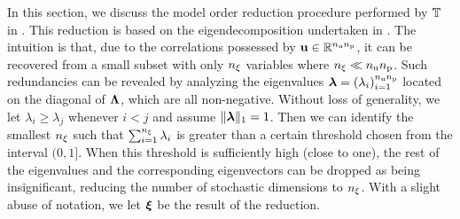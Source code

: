 In this section, we discuss the model order reduction procedure performed by $\transformation$ in .
This reduction is based on the eigendecomposition undertaken in .
The intuition is that, due to the correlations possessed by $\vu \in \real^{\nparams \nprocs}$, it can be recovered from a small subset with only $\nvars$ variables where $\nvars \ll \nparams \nprocs$.
Such redundancies can be revealed by analyzing the eigenvalues $\dimensionContribution = (\lambda_i)_{i = 1}^{\nparams \nprocs}$ located on the diagonal of $\mEDL$, which are all non-negative.
Without loss of generality, we let $\lambda_i \geq \lambda_j$ whenever $i < j$ and assume $\norm[1]{\dimensionContribution} = 1$.
Then we can identify the smallest $\nvars$ such that $\sum_{i = 1}^\nvars \lambda_i$ is greater than a certain threshold chosen from the interval $(0, 1]$.
When this threshold is sufficiently high (close to one), the rest of the eigenvalues and the corresponding eigenvectors can be dropped as being insignificant, reducing the number of stochastic dimensions to $\nvars$.
With a slight abuse of notation, we let $\vz$ be the result of the reduction.
